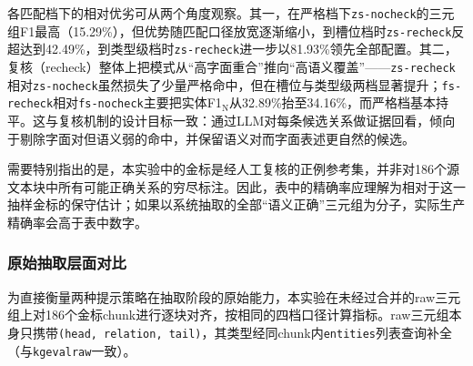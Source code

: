各匹配档下的相对优劣可从两个角度观察。其一，在严格档下\texttt{zs-nocheck}的三元组F1最高（15.29\%），但优势随匹配口径放宽逐渐缩小，到槽位档时\texttt{zs-recheck}反超达到42.49\%，到类型级档时\texttt{zs-recheck}进一步以81.93\%领先全部配置。其二，复核（recheck）整体上把模式从“高字面重合”推向“高语义覆盖”——\texttt{zs-recheck}相对\texttt{zs-nocheck}虽然损失了少量严格命中，但在槽位与类型级两档显著提升；\texttt{fs-recheck}相对\texttt{fs-nocheck}主要把实体F1$_\text{N}$从32.89\%抬至34.16\%，而严格档基本持平。这与复核机制的设计目标一致：通过LLM对每条候选关系做证据回看，倾向于剔除字面对但语义弱的命中，并保留语义对而字面表述更自然的候选。

需要特别指出的是，本实验中的金标是经人工复核的正例参考集，并非对186个源文本块中所有可能正确关系的穷尽标注。因此，表中的精确率应理解为相对于这一抽样金标的保守估计；如果以系统抽取的全部“语义正确”三元组为分子，实际生产精确率会高于表中数字。

\subsubsection{原始抽取层面对比}

为直接衡量两种提示策略在抽取阶段的原始能力，本实验在未经过合并的raw三元组上对186个金标chunk进行逐块对齐，按相同的四档口径计算指标。raw三元组本身只携带\texttt{(head, relation, tail)}，其类型经同chunk内\texttt{entities}列表查询补全（与\texttt{kgevalraw}一致）。

\begin{table}[ht]
    \centering
    \caption{原始抽取层面zs/fs $\times$ 复核 的多档匹配结果}
    \label{tab:5-raw-zsfs}
\end{table}

